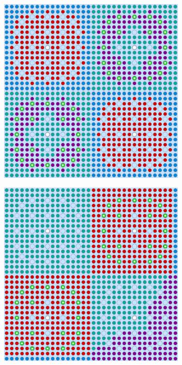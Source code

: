 \documentclass[12pt,twoside]{mitthesis-exec}
\begin{document}
\begin{figure}[h!]
\centering
\begin{subfigure}{0.47\textwidth}
  \centering
  \includegraphics[width=0.9\linewidth]{figures/unsupervised/geometries/with-features/2-clusters/combined/2x2}
  \caption{}
  \label{fig:2x2-2-clusters}
\end{subfigure}%
\begin{subfigure}{0.47\textwidth}
  \centering
  \includegraphics[width=0.85\linewidth]{figures/unsupervised/geometries/with-features/2-clusters/combined/reflector}

\end{subfigure}
\end{figure}
\end{document}
